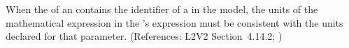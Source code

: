 When the   of an \EventAssignment
contains the identifier of a \Parameter in the model, the
units of the mathematical expression in the
\EventAssignment's  expression must be
consistent with the units declared for that parameter.
(References: L2V2 Section~4.14.2; )
